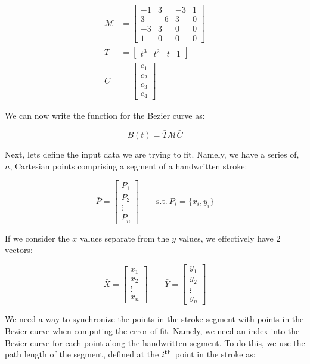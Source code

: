 \documentclass{article}
\newcommand{\Ith}{\ensuremath{i^\textrm{\footnotesize th}}}
\begin{document}
\begin{align*}
  \mathcal{M} &= \left[
    \begin{array}{rrrr}
      -1 &  3 & -3 & 1 \\
       3 & -6 &  3 & 0 \\
      -3 &  3 &  0 & 0 \\
       1 &  0 &  0 & 0
    \end{array}
  \right] \\
  \bar{T} &= \left[\begin{array}{cccc}t^3 & t^2 & t & 1\end{array}\right] \\
  \bar{C} &= \left[\begin{array}{r}c_1\\c_2\\c_3\\c_4\end{array}\right]
\end{align*}

We can now write the function for the Bezier curve as:

\[B(t)=\bar{T}\mathcal{M}\bar{C}\]

Next, lets define the input data we are trying to fit. Namely, we have a series of, $n$, Cartesian points comprising a segment of a handwritten stroke:

\[\bar{P}=\left[\begin{array}{c}P_1\\P_2\\\vdots\\P_n\end{array}\right] \qquad \textrm{s.t.}\ P_i=\{x_i,y_i\}\]

If we consider the $x$ values separate from the $y$ values, we effectively have 2 vectors:

\[\bar{X}=\left[\begin{array}{c}x_1\\x_2\\\vdots\\x_n\end{array}\right] \qquad \bar{Y}=\left[\begin{array}{c}y_1\\y_2\\\vdots\\y_n\end{array}\right]\]

We need a way to synchronize the points in the stroke segment with points in the Bezier curve when computing the error of fit. Namely, we need an index into the Bezier curve for each point along the handwritten segment. To do this, we use the path length of the segment, defined at the $\Ith$ point in the stroke as:
\end{document}
